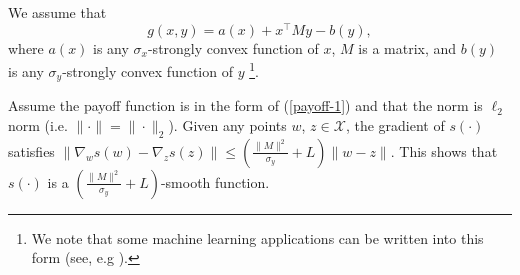 \documentclass[pmlr]{jmlr} %
\newcommand{\XX}{\mathcal{X}}
\begin{document}
We assume that
\begin{equation} \label{payoff-1}
g( x, y ) = a(x) +  x^{\top} M y - b(y),
\end{equation}
where $a(x)$ is any $\sigma_{x}$-strongly convex function of $x$, $M$ is a matrix, and $b(y)$ is any $\sigma_{y}$-strongly convex function of $y$ \footnote{We note that some machine learning applications can be written into this form (see, e.g \cite{XNLS05,ZX15}).}.

\begin{proposition} \label{smoothH-1}
Assume the payoff function is in the form of (\ref{payoff-1}) and that the norm is $\ell_{2}$ norm (i.e. $\|\cdot \| = \|\cdot \|_{2}$).
Given any points $w$, $z \in \XX$, the gradient of $s(\cdot)$ satisfies
$\| \nabla_{w} s(w) - \nabla_{z} s(z)\| \leq (\frac{\|M\|^{2}}{\sigma_{y}} + L) \| w - z\|$.
This shows that $s(\cdot)$ is a $(\frac{\|M\|^{2}}{\sigma_{y}} + L)$-smooth function.
\end{proposition}
\end{document}
